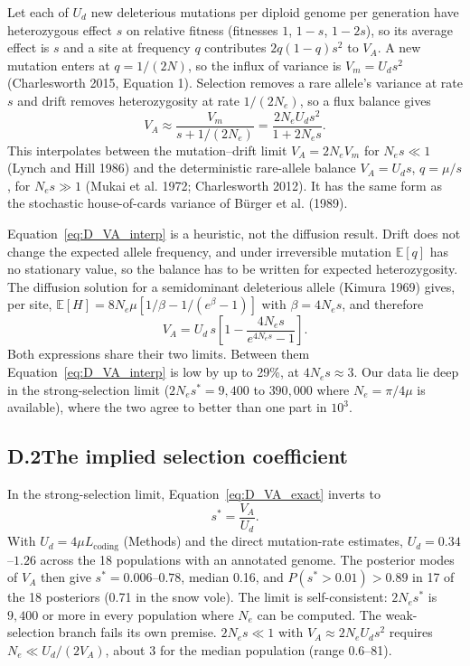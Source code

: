 \documentclass[12pt]{article}
\begin{document}
Let each of $U_d$ new deleterious mutations per diploid genome per generation have heterozygous effect $s$ on relative fitness (fitnesses $1$, $1-s$, $1-2s$), so its average effect is $s$ and a site at frequency $q$ contributes $2q(1-q)s^2$ to $V_A$. A new mutation enters at $q = 1/(2N)$, so the influx of variance is $V_m = U_d s^2$ (Charlesworth 2015, Equation 1). Selection removes a rare allele's variance at rate $s$ and drift removes heterozygosity at rate $1/(2N_e)$, so a flux balance gives
\begin{equation}
    V_A \approx \frac{V_m}{s + 1/(2N_e)} = \frac{2N_eU_ds^2}{1+2N_es}.
\label{eq:D_VA_interp}
\end{equation}
This interpolates between the mutation--drift limit $V_A = 2N_eV_m$ for $N_es \ll 1$ (Lynch and Hill 1986) and the deterministic rare-allele balance $V_A = U_ds$, $q = \mu/s$, for $N_es \gg 1$ (Mukai et al. 1972; Charlesworth 2012). It has the same form as the stochastic house-of-cards variance of Bürger et al. (1989).

Equation~\eqref{eq:D_VA_interp} is a heuristic, not the diffusion result. Drift does not change the expected allele frequency, and under irreversible mutation $\mathbb{E}[q]$ has no stationary value, so the balance has to be written for expected heterozygosity. The diffusion solution for a semidominant deleterious allele (Kimura 1969) gives, per site, $\mathbb{E}[H] = 8N_e\mu\left[1/\beta - 1/(e^\beta - 1)\right]$ with $\beta = 4N_es$, and therefore
\begin{equation}
    V_A = U_d\,s\left[1 - \frac{4N_es}{e^{4N_es}-1}\right].
\label{eq:D_VA_exact}
\end{equation}
Both expressions share their two limits. Between them Equation~\eqref{eq:D_VA_interp} is low by up to 29\%, at $4N_es \approx 3$. Our data lie deep in the strong-selection limit ($2N_es^* = 9{,}400$ to $390{,}000$ where $N_e = \pi/4\mu$ is available), where the two agree to better than one part in $10^3$.

\subsection*{D.2\quad The implied selection coefficient}

In the strong-selection limit, Equation~\eqref{eq:D_VA_exact} inverts to
\begin{equation}
    s^* = \frac{V_A}{U_d}.
\label{eq:sHoC}
\end{equation}
With $U_d = 4\mu L_\text{coding}$ (Methods) and the direct mutation-rate estimates, $U_d = 0.34$--$1.26$ across the 18 populations with an annotated genome. The posterior modes of $V_A$ then give $s^* = 0.006$--$0.78$, median 0.16, and $P(s^* > 0.01) > 0.89$ in 17 of the 18 posteriors (0.71 in the snow vole). The limit is self-consistent: $2N_es^*$ is $9{,}400$ or more in every population where $N_e$ can be computed. The weak-selection branch fails its own premise. $2N_es \ll 1$ with $V_A \approx 2N_eU_ds^2$ requires $N_e \ll U_d/(2V_A)$, about 3 for the median population (range 0.6--81).
\end{document}
